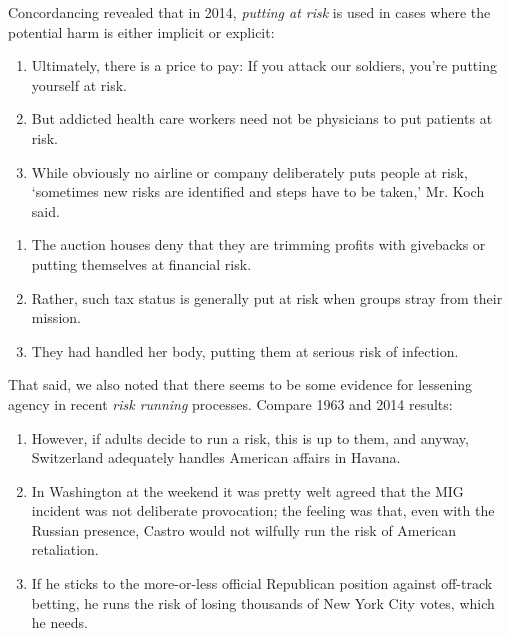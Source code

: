              Concordancing revealed that in 2014, \emph{putting at risk} is used in cases where the potential harm is either implicit or explicit:

            \begin{enumerate}  [before=\itshape,font=\normalfont] \setlength\itemsep{0em} \small
                \item Ultimately, there is a price to pay: If you attack our soldiers, you're putting yourself at risk.
                \item But addicted health care workers need not be physicians to put patients at risk.
                \item While obviously no airline or company deliberately puts people at risk, `sometimes new risks are identified and steps have to be taken,' Mr. Koch said.
            \end{enumerate}

            \begin{enumerate}  [before=\itshape,font=\normalfont] \setlength\itemsep{0em} \small
                \item The auction houses deny that they are trimming profits with givebacks or putting themselves at financial risk.
                \item Rather, such tax status is generally put at risk when groups stray from their mission.
                \item They had handled her body, putting them at serious risk of infection.
            \end{enumerate}

            That said, we also noted that there seems to be some evidence for lessening agency in recent \emph{risk running} processes. Compare 1963 and 2014 results:

            \begin{enumerate} [before=\itshape,font=\normalfont]  \setlength\itemsep{0em} \small
            \item However, if adults decide to run a risk, this is up to them, and anyway, Switzerland adequately handles American affairs in Havana.
            \item In Washington at the weekend it was pretty welt agreed that the MIG incident was not deliberate provocation; the feeling was that, even with the Russian presence, Castro would not wilfully run the risk of American retaliation.
            \item  If he sticks to the more-or-less official Republican position against off-track betting, he runs the risk of losing thousands of New York City votes, which he needs.
            \end{enumerate}

